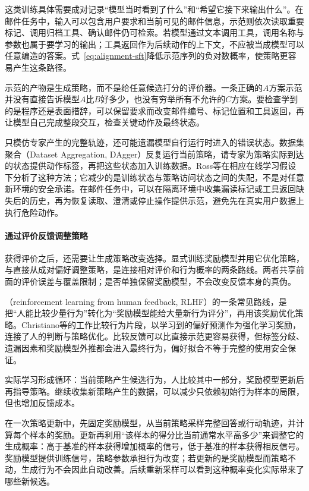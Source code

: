 这类训练具体需要成对记录“模型当时看到了什么”和“希望它接下来输出什么”。在邮件任务中，输入可以包含用户要求和当前可见的邮件信息，示范则依次读取重要标记、调用归档工具、确认邮件仍可检索。若模型通过文本调用工具，调用名称与参数也属于要学习的输出；工具返回作为后续动作的上下文，不应被当成模型可以任意编造的答案。式~\eqref{eq:alignment-sft}降低示范序列的负对数概率，使策略更容易产生这条路径。

示范的产物是生成策略，而不是给任意候选打分的评价器。一条正确的$A$方案示范并没有直接告诉模型$A$比$B$好多少，也没有穷举所有不允许的$C$方案。要检查学到的是程序还是表面措辞，可以保留要求而改变邮件编号、标记位置和工具返回，再让模型自己完成整段交互，检查关键动作及最终状态。

只模仿专家产生的完整轨迹，还可能遗漏模型自行运行时进入的错误状态。数据集聚合（Dataset Aggregation, DAgger）反复运行当前策略，请专家为策略实际到达的状态提供动作标签，再把这些状态加入训练数据。Ross等在相应在线学习假设下分析了这种方法；它减少的是训练状态与策略访问状态之间的失配，不是对任意新环境的安全承诺。在邮件任务中，可以在隔离环境中收集漏读标记或工具返回缺失后的历史，再为恢复读取、澄清或停止操作提供示范，避免先在真实用户数据上执行危险动作。

\paragraph{通过评价反馈调整策略}

获得评价之后，还需要让生成策略改变选择。显式训练奖励模型并用它优化策略，与直接从成对偏好调整策略，是连接相对评价和行为概率的两条路线。两者共享前面的评价误差与覆盖限制；是否单独保留奖励模型，不会改变反馈本身的真伪。

（reinforcement learning from human feedback, RLHF）的一条常见路线，是把“人能比较少量行为”转化为“奖励模型能给大量新行为评分”，再用该奖励优化策略。Christiano等的工作比较行为片段，以学习到的偏好预测作为强化学习奖励，连接了人的判断与策略优化。比较反馈可以比直接示范更容易获得，但标签分歧、遗漏因素和奖励模型外推都会进入最终行为，偏好拟合不等于完整的使用安全保证。

实际学习形成循环：当前策略产生候选行为，人比较其中一部分，奖励模型更新后再指导策略。继续收集新策略产生的数据，可以减少只依赖初始行为样本的局限，但也增加反馈成本。

在一次策略更新中，先固定奖励模型，从当前策略采样完整回答或行动轨迹，并计算每个样本的奖励。更新再利用“该样本的得分比当前通常水平高多少”来调整它的生成概率：高于基准的样本获得增加概率的信号，低于基准的样本获得相反信号。奖励模型提供训练信号，策略参数承担行为改变；若更新的是奖励模型而策略不动，生成行为不会因此自动改善。后续重新采样可以看到这种概率变化实际带来了哪些新候选。

